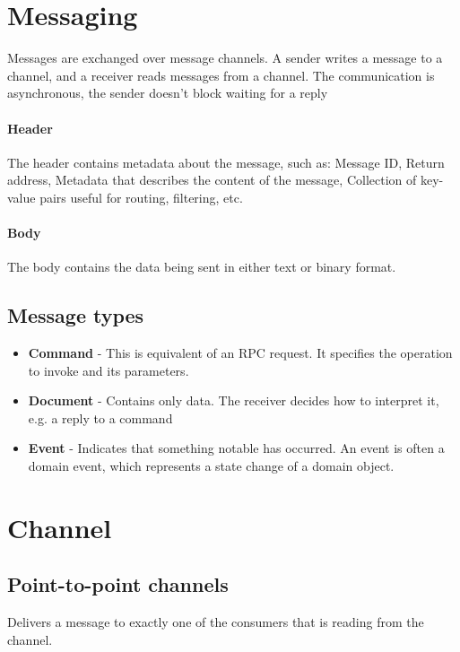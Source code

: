 \section{Messaging}
Messages are exchanged over message channels. A sender writes a message to a
channel, and a receiver reads messages from a channel. The communication is
asynchronous, the sender doesn't block waiting for a reply

\paragraph{Header}
The header contains metadata about the message, such as: Message ID, Return address, Metadata that describes the content of the message, Collection of key-value pairs useful for routing, filtering, etc.

\paragraph{Body}
The body contains the data being sent in either text or binary format.

\subsection{Message types}

\begin{itemize}

  \item \textbf{Command} - This is equivalent of an RPC request. It specifies the
        operation to invoke and its parameters.

  \item \textbf{Document} - Contains only data. The receiver decides how to interpret
        it, e.g. a reply to a command

  \item \textbf{Event} -  Indicates that something notable has occurred. An event is
        often a domain event, which represents a state change of a domain object.

\end{itemize}

\section{Channel}

\subsection{Point-to-point channels}
Delivers a message to exactly one of the
consumers that is reading from the channel.

